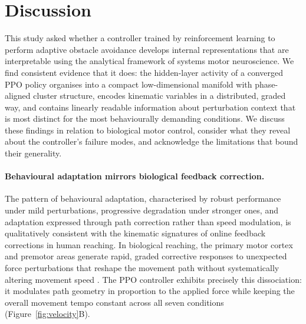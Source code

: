 \documentclass{article}
\begin{document}
\section{Discussion}

This study asked whether a controller trained by reinforcement learning
to perform adaptive obstacle avoidance develops internal representations
that are interpretable using the analytical framework of systems motor
neuroscience.
We find consistent evidence that it does: the hidden-layer activity of
a converged PPO policy organises into a compact low-dimensional manifold
with phase-aligned cluster structure, encodes kinematic variables in a
distributed, graded way, and contains linearly readable information about
perturbation context that is most distinct for the most behaviourally
demanding conditions.
We discuss these findings in relation to biological motor control,
consider what they reveal about the controller's failure modes, and
acknowledge the limitations that bound their generality.

\paragraph{Behavioural adaptation mirrors biological feedback correction.}

The pattern of behavioural adaptation, characterised by robust performance
under mild perturbations, progressive degradation under stronger ones, and
adaptation expressed through path correction rather than speed modulation,
is qualitatively consistent with the kinematic signatures of online feedback
corrections in human reaching.
In biological reaching, the primary motor cortex and premotor areas
generate rapid, graded corrective responses to unexpected force perturbations
that reshape the movement path without systematically altering movement
speed \citep{Pruszynski2012,Nashed2014,FlashHogan1985,Scott2004,Dimitriou2013,Shadmehr1994,Diedrichsen2010}.
The PPO controller exhibits precisely this dissociation: it modulates
path geometry in proportion to the applied force while keeping the overall
movement tempo constant across all seven conditions (Figure~\ref{fig:velocity}B).
\end{document}
